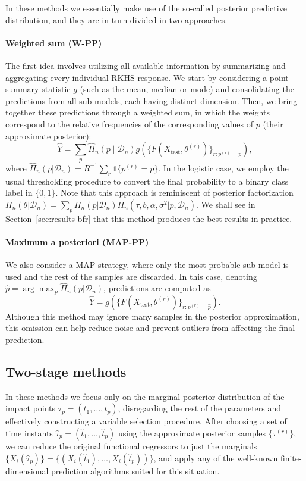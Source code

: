 In these methods we essentially make use of the so-called posterior predictive distribution, and they are in turn divided in two approaches.

  \paragraph{Weighted sum (W-PP)} The first idea involves utilizing all available information by summarizing and aggregating every individual \acs{RKHS} response. We start by considering a point summary statistic \(g\) (such as the mean, median or mode) and consolidating the predictions from all sub-models, each having distinct dimension. Then, we bring together these predictions through a weighted sum, in which the weights correspond to the relative frequencies of the corresponding values of \(p\) (their approximate posterior):
  \[
  \hat Y = \sum_{p} \hat\Pi_n(p\mid\mathcal D_n) g\left(\{F(X_{\text{test}}, \theta^{(r)})\}_{r:p^{(r)}=p}\right),
  \]
  where \(\hat \Pi_n(p|\mathcal D_n) = R^{-1}\sum_r \mathds 1\{p^{(r)}=p\}\). In the logistic case, we employ the usual thresholding procedure to convert the final probability to a binary class label in \(\{0,1\}\). Note that this approach is reminiscent of posterior factorization \(\Pi_n(\theta|\mathcal D_n) = \sum_{p}\Pi_n(p|\mathcal D_n)\Pi_n(\tau,b,\alpha,\sigma^2|p, \mathcal D_n)\). We shall see in Section~\ref{sec:results-bfr} that this method produces the best results in practice.

  \paragraph{Maximum a posteriori (MAP-PP)} We also consider a \acf{MAP} strategy, where only the most probable sub-model is used and the rest of the samples are discarded. In this case, denoting \(\hat p = \arg\max_p \hat\Pi_n(p|\mathcal D_n)\), predictions are computed as 
  \[
  \hat Y = g\left(\{F(X_{\text{test}}, \theta^{(r)})\}_{r:p^{(r)}=\hat p}\right).
  \] 
  Although this method may ignore many samples in the posterior approximation, this omission can help reduce noise and prevent outliers from affecting the final prediction.

\subsection{Two-stage methods}

In these methods we focus only on the marginal posterior distribution of the impact points \(\tau_p = (t_1, \dots, t_p)\), disregarding the rest of the parameters and effectively constructing a variable selection procedure. After choosing a set of time instants \(\hat \tau_p=(\hat t_1,\dots, \hat t_p)\) using the approximate posterior samples \(\{\tau^{(r)}\}\), we can reduce the original functional regressors to just the marginals \(\{X_i(\hat \tau_p)\}=\{(X_i(\hat t_1),\dots, X_i(\hat t_p))\}\), and apply any of the well-known finite-dimensional prediction algorithms suited for this situation.

